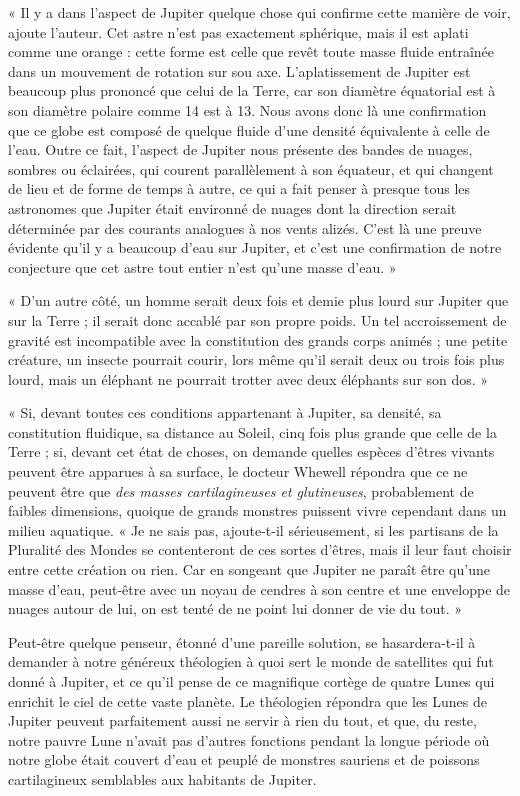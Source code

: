 \documentclass[a4paper, 11pt, oneside]{article}
\begin{document}
« Il y a dans l'aspect de Jupiter quelque chose qui confirme cette manière de voir, ajoute l'auteur. Cet astre n'est pas exactement sphérique, mais il est aplati comme une orange : cette forme est celle que revêt toute masse fluide entraînée dans un mouvement de rotation sur sou axe. L'aplatissement de Jupiter est beaucoup plus prononcé que celui de la Terre, car son diamètre équatorial est à son diamètre polaire comme 14 est à 13. Nous avons donc là une confirmation que ce globe est composé de quelque fluide d'une densité équivalente à celle de l'eau. Outre ce fait, l'aspect de Jupiter nous présente des bandes de nuages, sombres ou éclairées, qui courent parallèlement à son équateur, et qui changent de lieu et de forme de temps à autre, ce qui a fait penser à presque tous les astronomes que Jupiter était environné de nuages dont la direction serait déterminée par des courants analogues à nos vents alizés. C'est là une preuve évidente qu'il y a beaucoup d'eau sur Jupiter, et c'est une confirmation de notre conjecture que cet astre tout entier n'est qu'une masse d'eau. »

« D'un autre côté, un homme serait deux fois et demie plus lourd sur Jupiter que sur la Terre ; il serait donc accablé par son propre poids. Un tel accroissement de gravité est incompatible avec la constitution des grands corps animés ; une petite créature, un insecte pourrait courir, lors même qu'il serait deux ou trois fois plus lourd, mais un éléphant ne pourrait trotter avec deux éléphants sur son dos. »

« Si, devant toutes ces conditions appartenant à Jupiter, sa densité, sa constitution fluidique, sa distance au Soleil, cinq fois plus grande que celle de la Terre ; si, devant cet état de choses, on demande quelles espèces d'êtres vivants peuvent être apparues à sa surface, le docteur Whewell répondra que ce ne peuvent être que \emph{des masses cartilagineuses et glutineuses}, probablement de faibles dimensions, quoique de grands monstres puissent vivre cependant dans un milieu aquatique. « Je ne sais pas, ajoute-t-il sérieusement, si les partisans de la Pluralité des Mondes se contenteront de ces sortes d'êtres, mais il leur faut choisir entre cette création ou rien. Car en songeant que Jupiter ne paraît être qu'une masse d'eau, peut-être avec un noyau de cendres à son centre et une enveloppe de nuages autour de lui, on est tenté de ne point lui donner de vie du tout. »

Peut-être quelque penseur, étonné d'une pareille solution, se hasardera-t-il à demander à notre généreux théologien à quoi sert le monde de satellites qui fut donné à Jupiter, et ce qu'il pense de ce magnifique cortège de quatre Lunes qui enrichit le ciel de cette vaste planète. Le théologien répondra que les Lunes de Jupiter peuvent parfaitement aussi ne servir à rien du tout, et que, du reste, notre pauvre Lune n'avait pas d'autres fonctions pendant la longue période où notre globe était couvert d'eau et peuplé de monstres sauriens et de poissons cartilagineux semblables aux habitants de Jupiter.
\end{document}
